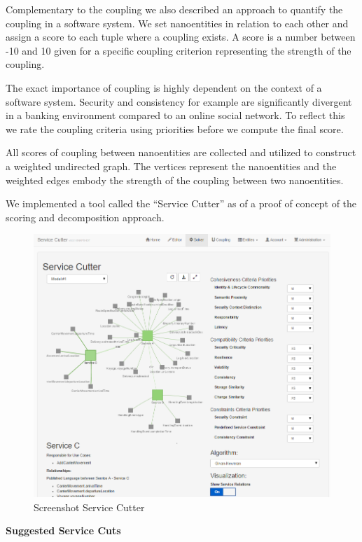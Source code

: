 Complementary to the coupling we also described an approach to quantify the coupling in a software system.  We set nanoentities in relation to each other and assign a score to each tuple where a coupling exists. A score is a number between -10 and 10 given for a specific coupling criterion representing the strength of the coupling.

The exact importance of coupling is highly dependent on the context of a software system. Security and consistency for example are significantly divergent in a banking environment compared to an online social network. To reflect this we rate the coupling criteria using priorities before we compute the final score.

All scores of coupling between nanoentities are collected and utilized to construct a weighted undirected graph. The vertices represent the nanoentities and the weighted edges embody the strength of the coupling between two nanoentities.

We implemented a tool called the \enquote{Service Cutter} as of a proof of concept of the scoring and decomposition approach.

\begin{figure}[H]
	\includegraphics[scale=0.65]{images/ServiceCutter.png}
	\caption{Screenshot Service Cutter}
	\label{fig:ServiceCutter-mgmt-summary}
\end{figure}

\textbf{Suggested Service Cuts}

